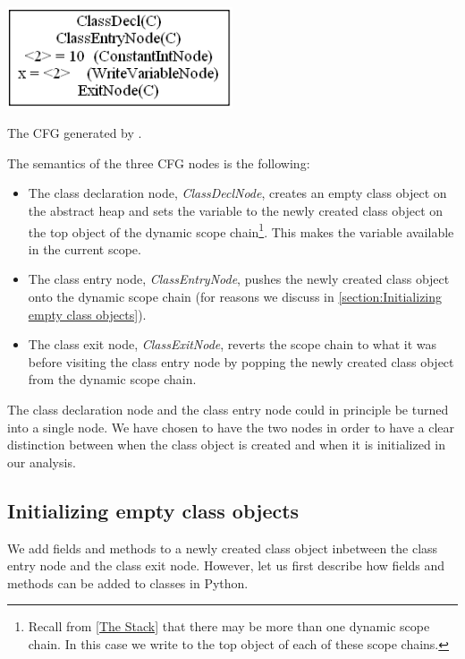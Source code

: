 \begin{listing}[H]
	\begin{center}
		\includegraphics[width=0.5\textwidth]{images/class-decl-cfg.png}
	\end{center}
	\vspace{-10pt}
	\caption{The CFG generated by .}
\end{listing}

The semantics of the three CFG nodes is the following:

\begin{itemize}
	\item The class declaration node, \textit{ClassDeclNode}, creates an empty class object on the abstract heap and sets the variable  to the newly created class object on the top object of the dynamic scope chain\footnote{Recall from \autoref{The Stack} that there may be more than one dynamic scope chain. In this case we write  to the top object of each of these scope chains.}. This makes the variable  available in the current scope.
	\item The class entry node, \textit{ClassEntryNode}, pushes the newly created class object onto the dynamic scope chain (for reasons we discuss in \autoref{section:Initializing empty class objects}).
	\item The class exit node, \textit{ClassExitNode}, reverts the scope chain to what it was before visiting the class entry node by popping the newly created class object from the dynamic scope chain.
\end{itemize}

The class declaration node and the class entry node could in principle be turned into a single node. We have chosen to have the two nodes in order to have a clear distinction between when the class object is created and when it is initialized in our analysis.


\subsection{Initializing empty class objects}
\label{section:Initializing empty class objects}
We add fields and methods to a newly created class object inbetween the class entry node and the class exit node. However, let us first describe how fields and methods can be added to classes in Python.

